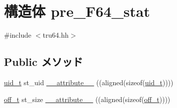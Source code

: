 \hypertarget{structTru64__PreF64_1_1pre__F64__stat}{
\section{構造体 pre\_\-F64\_\-stat}
\label{structTru64__PreF64_1_1pre__F64__stat}
}


{\ttfamily \#include $<$tru64.hh$>$}\subsection*{Public メソッド}
\begin{DoxyCompactItemize}
\item 
\hyperlink{classTru64_af2306308627701b66dc6f3babe821ab4}{uid\_\-t} st\_\-uid \hyperlink{structTru64__PreF64_1_1pre__F64__stat_a9e6045dec3e69974586d17b8d3d8bfd6}{\_\-\_\-attribute\_\-\_\-} ((aligned(sizeof(\hyperlink{classTru64_af2306308627701b66dc6f3babe821ab4}{uid\_\-t}))))
\item 
\hyperlink{classTru64_a2cb84cf5f02a29b7e8f237ff151a9225}{off\_\-t} st\_\-size \hyperlink{structTru64__PreF64_1_1pre__F64__stat_a3d6ca7a7b80acd14cad7cb98240c371f}{\_\-\_\-attribute\_\-\_\-} ((aligned(sizeof(\hyperlink{classTru64_a2cb84cf5f02a29b7e8f237ff151a9225}{off\_\-t}))))
\end{DoxyCompactItemize}
